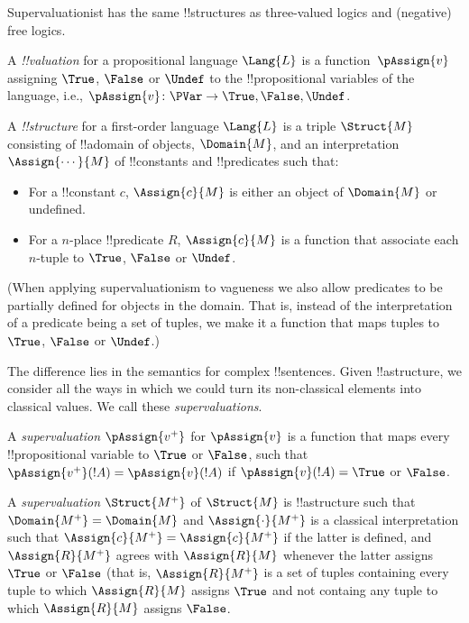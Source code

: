 \documentclass[../../../include/open-logic-section]{subfiles}
\begin{document}


Supervaluationist has the same !!{structure}s as three-valued logics and (negative) free logics. 

\begin{defn}[!!^{structure}s] 
A \emph{!!{valuation}} for a propositional language $\Lang{L}$ is a function~$\pAssign{v}$ assigning $\True$, $\False$ or $\Undef$ to the !!{propositional variable}s of the language, i.e., $\pAssign{v} \colon
\PVar \to {\True,\False,\Undef}$.

A \emph{!!{structure}} for a first-order language $\Lang{L}$ is a triple $\Struct{M}$ consisting of !!a{domain} of objects, $\Domain{M}$, and an interpretation $\Assign{\cdots}{M}$ of !!{constant}s and !!{predicate}s such that:

\begin{itemize}
	\item For a !!{constant} $c$, $\Assign{c}{M}$ is either an object of $\Domain{M}$ or undefined.
	\item For a $n$-place !!{predicate} $R$, $\Assign{c}{M}$ is a function that associate each $n$-tuple to $\True$, $\False$ or $\Undef$.
\end{itemize}
\end{defn}

(When applying supervaluationism to vagueness we also allow predicates to be partially defined for objects in the domain. That is, instead of the interpretation of a predicate being a set of tuples, we make it a function that maps tuples to $\True$, $\False$ or $\Undef$.)

The difference lies in the semantics for complex !!{sentence}s. Given !!a{structure}, we consider all the ways in which we could turn its non-classical elements into classical values. We call these \emph{supervaluations}.

\begin{defn}[Supervaluations]
A \emph{supervaluation} $\pAssign{v^+}$ for $\pAssign{v}$ is a function that maps every !!{propositional variable} to $\True$ or $\False$, such that $\pAssign{v^+}(!A)=\pAssign{v}(!A)$ if $\pAssign{v}(!A) = \True$ or $\False$. 

A \emph{supervaluation} $\Struct{M^+}$ of $\Struct{M}$ is !!a{structure} such that $\Domain{M^+}=\Domain{M}$ and $\Assign{\cdot}{M^+}$ is a classical interpretation such that $\Assign{c}{M^+} = \Assign{c}{M^+}$ if the latter is defined, and $\Assign{R}{M^+}$ agrees with $\Assign{R}{M}$ whenever the latter assigns $\True$ or $\False$ (that is, $\Assign{R}{M^+}$ is a set of tuples containing every tuple to which $\Assign{R}{M}$ assigns $\True$ and not containg any tuple to which $\Assign{R}{M}$ assigns $\False$.
\end{defn}
\end{document}

